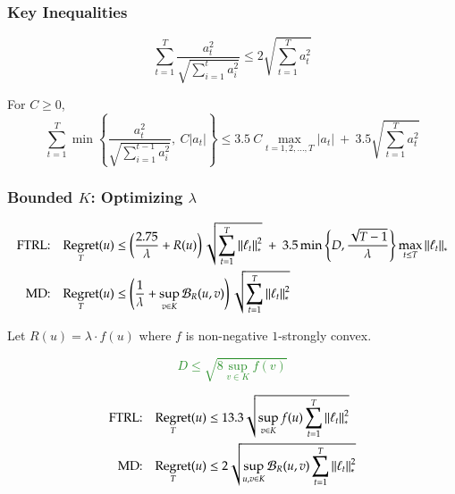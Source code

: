 \documentclass[usenames,dvipsnames]{beamer}
\newtheorem*{proposition}{Proposition}
\DeclareMathOperator{\Regret}{Regret}
\newcommand{\norm}[1]{\left\|#1\right\|}
\newcommand{\Breg}{\mathcal{B}}
\begin{document}
\begin{frame}
\frametitle{Key Inequalities}

\begin{lemma}
$$
\sum_{t=1}^T \frac{a_t^2}{\sqrt{\sum_{i=1}^t a_i^2}} \le 2 \sqrt{\sum_{t=1}^T a_t^2}
$$
\end{lemma}

\pause

\begin{lemma}
For $C \ge 0$,
$$
\sum_{t=1}^T \min \left\{ \frac{a_t^2}{\sqrt{\sum_{i=1}^{t-1} a_i^2}}, \ C |a_t| \right\}
\le 3.5 \ C \max_{t=1,2,\dots,T} |a_t| \ + \ 3.5 \sqrt{\sum_{t=1}^T a_t^2}
$$
\end{lemma}


\end{frame}


\begin{frame}
\frametitle{Bounded $K$: Optimizing $\lambda$}

\fontsize{8.5pt}{10}\selectfont

\begin{align*}
\textsc{FTRL:} & & \Regret_T(u) & \le \left( \frac{2.75}{\lambda} + R(u)\right) \sqrt{\sum_{t=1}^T \norm{\ell_t}_*^2} \ + \ 3.5 \min \left\{ D, \frac{\sqrt{T-1}}{\lambda} \right\} \max_{t \le T} \norm{\ell_t}_* \\
\textsc{MD:} & & \Regret_T(u) & \le \left( \frac{1}{\lambda} + \sup_{v \in K} \Breg_{R}(u,v) \right) \sqrt{\sum_{t=1}^T \norm{\ell_t}_*^2}
\end{align*}

\vspace{0.3cm}

\pause
Let $R(u) = \lambda \cdot f(u)$ where $f$ is non-negative $1$-strongly convex.

\pause

\textcolor{ForestGreen}{
$$
D \le \sqrt{8 \sup_{v \in K} f(v)}
$$
}

\pause

\begin{align*}
\textsc{FTRL:} & & \Regret_T(u) & \le 13.3 \sqrt{\sup_{v \in K} f(u) \sum_{t=1}^T \norm{\ell_t}_*^2} \\
\textsc{MD:} & & \Regret_T(u) & \le 2 \sqrt{\sup_{u, v \in K} \Breg_{R}(u,v) \sum_{t=1}^T \norm{\ell_t}_*^2}
\end{align*}
\end{frame}
\end{document}

